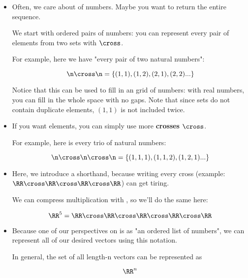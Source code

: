     \begin{itemize}
    
        \item Often, we care about  of numbers. Maybe you want to return the entire sequence.
        
        We start with ordered pairs of numbers: you can represent every pair of elements from two sets with $\cross$.
        
        For example, here we have "every pair of two natural numbers":
        
            \begin{equation}
                \n \cross \n = \{(1,1), (1,2), (2,1), (2,2)...\}
            \end{equation}
            
        Notice that this can be used to fill in an grid of numbers: with real numbers, you can fill in the whole space with no gaps.
        Note that since sets do not contain duplicate elements, $(1,1)$ is not included twice. 

        \item If you want  elements, you can simply use more \textbf{crosses} $\cross$.
        
        For example, here is every trio of natural numbers:
        
            \begin{equation}
                \n \cross \n \cross \n = \{(1,1,1), (1,1,2), (1,2,1)...\}
            \end{equation}
            
        \item Here, we introduce a shorthand, because writing every cross (example: $\RR \cross \RR \cross \RR \cross \RR $) can get tiring.
        
        We can compress multiplication with , so we'll do the same here:
        
            \begin{equation}
                \RR^5 = \RR \cross \RR \cross \RR \cross \RR \cross \RR
            \end{equation}
            
        \item Because one of our perspectives on  is as "an ordered list of numbers", we can represent all of our desired vectors using this notation.
        
        In general, the set of all length-n vectors can be represented as 
        
            \begin{equation}
                \RR^{n}
            \end{equation}
    \end{itemize}
    
